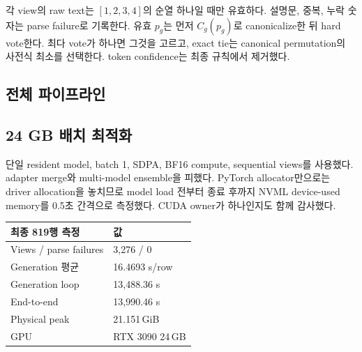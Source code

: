 \documentclass[9pt,a4paper]{extarticle}
\begin{document}
\begin{multicols}{2}
각 view의 raw text는 $[1,2,3,4]$의 순열 하나일 때만 유효하다. 설명문, 중복,
누락 숫자는 parse failure로 기록한다. 유효 $p_g$는 먼저 $C_g(p_g)$로
canonicalize한 뒤 hard vote한다. 최다 vote가 하나면 그것을 고르고, exact tie는
canonical permutation의 사전식 최소를 선택한다. token confidence는 최종
규칙에서 제거했다.

\subsection{전체 파이프라인}
\begin{center}
\end{center}

\subsection{24 GB 배치 최적화}

단일 resident model, batch 1, SDPA, BF16 compute, sequential views를 사용했다.
adapter merge와 multi-model ensemble을 피했다. PyTorch allocator만으로는 driver
allocation을 놓치므로 model load 전부터 종료 후까지 NVML device-used memory를
0.5초 간격으로 측정했다. CUDA owner가 하나인지도 함께 감사했다.

\begin{tabularx}{\linewidth}{@{}lR{20mm}@{}}
\toprule
최종 819행 측정 & 값\\
\midrule
Views / parse failures & 3,276 / 0\\
Generation 평균 & 16.4693 s/row\\
Generation loop & 13,488.36 s\\
End-to-end & 13,990.46 s\\
Physical peak & 21.151\,GiB\\
GPU & RTX 3090 24\,GB\\
\bottomrule
\end{tabularx}
\end{multicols}
\end{document}
